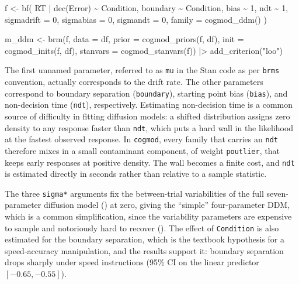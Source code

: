 \documentclass[
  jou,
  floatsintext,
  longtable,
  nolmodern,
  notxfonts,
  notimes,
  12pt,
  colorlinks=true,linkcolor=blue,citecolor=blue,urlcolor=blue]{apa7}
\newenvironment{Shaded}{\begin{snugshade}}{\end{snugshade}}
\newcommand{\AttributeTok}[1]{\textcolor[rgb]{0.40,0.45,0.13}{#1}}
\newcommand{\DecValTok}[1]{\textcolor[rgb]{0.68,0.00,0.00}{#1}}
\newcommand{\FunctionTok}[1]{\textcolor[rgb]{0.28,0.35,0.67}{#1}}
\newcommand{\NormalTok}[1]{\textcolor[rgb]{0.00,0.23,0.31}{#1}}
\newcommand{\OtherTok}[1]{\textcolor[rgb]{0.00,0.23,0.31}{#1}}
\newcommand{\SpecialCharTok}[1]{\textcolor[rgb]{0.37,0.37,0.37}{#1}}
\newcommand{\StringTok}[1]{\textcolor[rgb]{0.13,0.47,0.30}{#1}}
\begin{document}
\begin{Shaded}
\begin{Highlighting}[]
\NormalTok{f }\OtherTok{\textless{}{-}} \FunctionTok{bf}\NormalTok{(}
\NormalTok{  RT }\SpecialCharTok{|} \FunctionTok{dec}\NormalTok{(Error) }\SpecialCharTok{\textasciitilde{}}\NormalTok{ Condition,}
\NormalTok{  boundary }\SpecialCharTok{\textasciitilde{}}\NormalTok{ Condition,}
\NormalTok{  bias }\SpecialCharTok{\textasciitilde{}} \DecValTok{1}\NormalTok{,}
\NormalTok{  ndt }\SpecialCharTok{\textasciitilde{}} \DecValTok{1}\NormalTok{,}
  \AttributeTok{sigmadrift =} \DecValTok{0}\NormalTok{, }
  \AttributeTok{sigmabias =} \DecValTok{0}\NormalTok{, }
  \AttributeTok{sigmandt =} \DecValTok{0}\NormalTok{,}
  \AttributeTok{family =} \FunctionTok{cogmod\_ddm}\NormalTok{()}
\NormalTok{)}

\NormalTok{m\_ddm }\OtherTok{\textless{}{-}} \FunctionTok{brm}\NormalTok{(f, }\AttributeTok{data =}\NormalTok{ df,}
             \AttributeTok{prior =} \FunctionTok{cogmod\_priors}\NormalTok{(f, df),}
             \AttributeTok{init =} \FunctionTok{cogmod\_inits}\NormalTok{(f, df),}
             \AttributeTok{stanvars =} \FunctionTok{cogmod\_stanvars}\NormalTok{(f)) }\SpecialCharTok{|\textgreater{}}
  \FunctionTok{add\_criterion}\NormalTok{(}\StringTok{"loo"}\NormalTok{)}
\end{Highlighting}
\end{Shaded}

The first unnamed parameter, referred to as \texttt{mu} in the Stan code
as per \texttt{brms} convention, actually corresponds to the drift rate.
The other parameters correspond to boundary separation
(\texttt{boundary}), starting point bias (\texttt{bias}), and
non-decision time (\texttt{ndt}), respectively. Estimating non-decision
time is a common source of difficulty in fitting diffusion models: a
shifted distribution assigns zero density to any response faster than
\texttt{ndt}, which puts a hard wall in the likelihood at the fastest
observed response. In \texttt{cogmod}, every family that carries an
\texttt{ndt} therefore mixes in a small contaminant component, of weight
\texttt{poutlier}, that keeps early responses at positive density. The
wall becomes a finite cost, and \texttt{ndt} is estimated directly in
seconds rather than relative to a sample statistic.

The three \texttt{sigma*} arguments fix the between-trial variabilities
of the full seven-parameter diffusion model
() at
zero, giving the ``simple'' four-parameter DDM, which is a common
simplification, since the variability parameters are expensive to sample
and notoriously hard to recover
(). The effect of
\texttt{Condition} is also estimated for the boundary separation, which
is the textbook hypothesis for a speed-accuracy manipulation, and the
results support it: boundary separation drops sharply under speed
instructions (95\% CI on the linear predictor \([-0.65, -0.55]\)).
\end{document}
